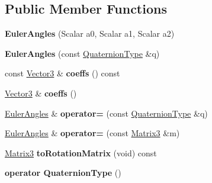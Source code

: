 \subsection*{Public Member Functions}
\begin{DoxyCompactItemize}
\item 
\mbox{\label{class_euler_angles_a9989e37ec12c0ac9b71d8427a2d8d0ef}} 
{\bfseries Euler\+Angles} (Scalar a0, Scalar a1, Scalar a2)
\item 
\mbox{\label{class_euler_angles_acd4096f3d77cb63a57ffaaf494606f94}} 
{\bfseries Euler\+Angles} (const \hyperlink{group___geometry___module_class_eigen_1_1_quaternion}{Quaternion\+Type} \&q)
\item 
\mbox{\label{class_euler_angles_a393c0dfb2c025f3c8e62e517803e3b8c}} 
const \hyperlink{group___core___module}{Vector3} \& {\bfseries coeffs} () const
\item 
\mbox{\label{class_euler_angles_a7000f149f7e8b0c1c18a559021771bb9}} 
\hyperlink{group___core___module}{Vector3} \& {\bfseries coeffs} ()
\item 
\mbox{\label{class_euler_angles_a1eee54f4ee3b2fddc8e463a95a654575}} 
\hyperlink{class_eigen_1_1_euler_angles}{Euler\+Angles} \& {\bfseries operator=} (const \hyperlink{group___geometry___module_class_eigen_1_1_quaternion}{Quaternion\+Type} \&q)
\item 
\mbox{\label{class_euler_angles_a205606bcdcfc9ae5cd0d82d54f8639ed}} 
\hyperlink{class_eigen_1_1_euler_angles}{Euler\+Angles} \& {\bfseries operator=} (const \hyperlink{group___core___module_class_eigen_1_1_matrix}{Matrix3} \&m)
\item 
\mbox{\label{class_euler_angles_a4757b31c441ff9e5b75d2e24f9bea545}} 
\hyperlink{group___core___module_class_eigen_1_1_matrix}{Matrix3} {\bfseries to\+Rotation\+Matrix} (void) const
\item 
\mbox{\label{class_euler_angles_a485da08548c361bbe1a9d62715c8e0eb}} 
{\bfseries operator Quaternion\+Type} ()
\item 
\mbox{\label{class_euler_angles_a9989e37ec12c0ac9b71d8427a2d8d0ef}} 

\end{DoxyCompactItemize}
